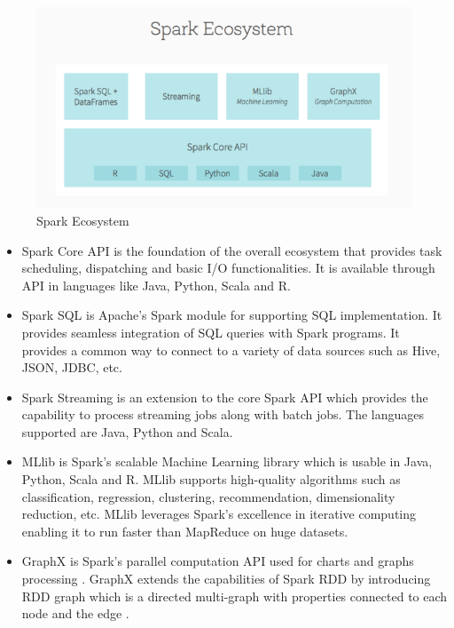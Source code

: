 \documentclass[sigconf]{acmart}
\begin{document}
\begin{figure}
\includegraphics[width=\columnwidth]{images/spark-ecosystem}
\caption{Spark Ecosystem \cite{img-echo}}
\label{Figure 2}
\end{figure}

\begin{itemize}

	\item Spark Core API is the foundation of the overall ecosystem that provides task scheduling, dispatching and basic I/O functionalities. It is available through API in languages like Java, Python, Scala and R.

  \item Spark SQL is Apache's Spark module for supporting SQL implementation. It provides seamless integration of SQL queries with Spark programs. It provides a common way to connect to a variety of data sources such as Hive, JSON, JDBC, etc.
  
  \item Spark Streaming is an extension to the core Spark API which provides the capability to process streaming jobs along with batch jobs. The languages supported are Java, Python and Scala.

  \item MLlib is Spark's scalable Machine Learning library which is usable in Java, Python, Scala and R. MLlib supports high-quality algorithms such as classification, regression, clustering, recommendation, dimensionality reduction, etc. MLlib leverages Spark's excellence in iterative computing enabling it to run faster than MapReduce on huge datasets.

  \item GraphX is Spark's parallel computation API used for charts and graphs processing \cite{fu2016spark-p1}. GraphX extends the capabilities of Spark RDD by introducing RDD graph which is a directed multi-graph with properties connected to each node and the edge \cite{spark-a1}. 
  
\end{itemize}
\end{document}
